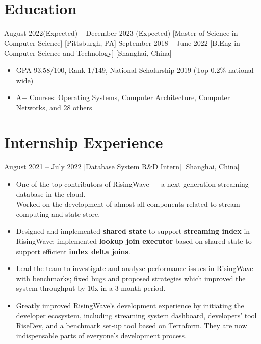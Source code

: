 \documentclass{chicv}
\begin{document}


\section{Education}
  {August 2022(Expected) -- December 2023 (Expected)}
  [Master of Science in Computer Science]
  [Pittsburgh, PA]
  {September 2018 -- June 2022}
  [B.Eng in Computer Science and Technology]
  [Shanghai, China]
  \begin{itemize}
    \item GPA 93.58/100, Rank 1/149, National Scholarship 2019 (Top 0.2\% national-wide)
    \item A+ Courses: Operating Systems, Computer Architecture, Computer Networks, and 28 others
  \end{itemize}

\section{Internship Experience}

  {August 2021 – July 2022}
  [Database System R\&D Intern]
  [Shanghai, China]

\begin{itemize}
  \item One of the top contributors of RisingWave — a next-generation streaming database in the cloud. \\ Worked on the development of almost all components related to stream computing and state store.
  \item Designed and implemented \textbf{shared state} to support \textbf{streaming index} in RisingWave; implemented \textbf{lookup join executor} based on shared state to support efficient \textbf{index delta joins}.
  \item Lead the team to investigate and analyze performance issues in RisingWave with benchmarks; fixed bugs and proposed strategies which improved the system throughput by 10x in a 3-month period.
  \item Greatly improved RisingWave’s development experience by initiating the developer ecosystem, including streaming system dashboard, developers’ tool RiseDev, and a benchmark set-up tool based on Terraform. They are now indispensable parts of everyone’s development process.
\end{itemize}
\end{document}
